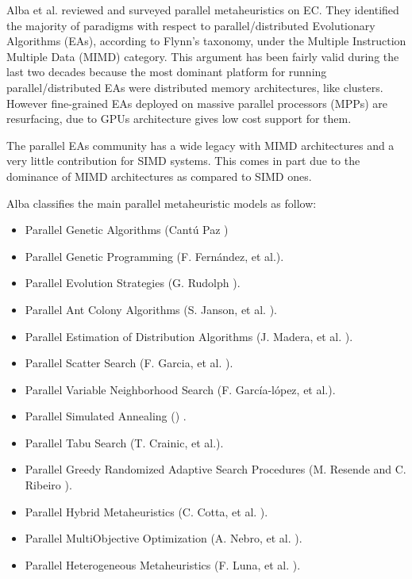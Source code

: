 \documentclass{comjnl}
\begin{document}
Alba et al. \cite{Alba2005book} reviewed and surveyed parallel metaheuristics on EC. They identified the majority of paradigms with respect to parallel/distributed Evolutionary Algorithms (EAs), according to Flynn's taxonomy, under the Multiple Instruction Multiple Data (MIMD) category. This argument has been fairly valid during the last two decades because the most dominant platform for running parallel/distributed EAs were distributed memory architectures, like clusters. However fine-grained EAs deployed on massive parallel processors (MPPs) are resurfacing, due to GPUs architecture gives low cost support for them.

The parallel EAs community has a wide legacy with MIMD architectures and a very little contribution for SIMD systems. This comes in part due to the dominance of MIMD architectures as compared to SIMD ones.

Alba classifies the main parallel metaheuristic models as follow:
\begin{itemize}
\item Parallel Genetic Algorithms (Cant\'u Paz \cite{Cantu-Paz98asurvey}) %
\item Parallel Genetic Programming (F. Fern\'andez, et al.\cite{springerlink:10.1023_A:1021873026259}).
\item Parallel Evolution Strategies (G. Rudolph \cite{Rudolph92parallelapproaches}).
\item Parallel Ant Colony Algorithms (S. Janson, et al. \cite{ParallelAntColony}).
\item Parallel Estimation of Distribution Algorithms (J. Madera, et al. \cite{springerlink:10.1007_3_540_32494_1_7}).
\item Parallel Scatter Search (F. Garcia, et al. \cite{GarciaLopez2003575}).
\item Parallel Variable Neighborhood Search (F. Garc\'ia-l\'opez, et al.\cite{Garcia_lopez_theparallel}).
\item Parallel Simulated Annealing (\cite{Genetic_parallelsimulated}) .
\item Parallel Tabu Search (T. Crainic, et al.\cite{Crainic97towardsa}).
\item Parallel Greedy Randomized Adaptive Search Procedures (M. Resende and C. Ribeiro \cite{Resendeparallelgreedy}).
\item Parallel Hybrid Metaheuristics (C. Cotta, et al. \cite{Cotta05e:parallel}). 
\item Parallel MultiObjective Optimization (A. Nebro, et al. \cite{Nebro07mocell:a}).
\item Parallel Heterogeneous Metaheuristics (F. Luna, et al. \cite{ANL04}). 
\end{itemize}
\end{document}
